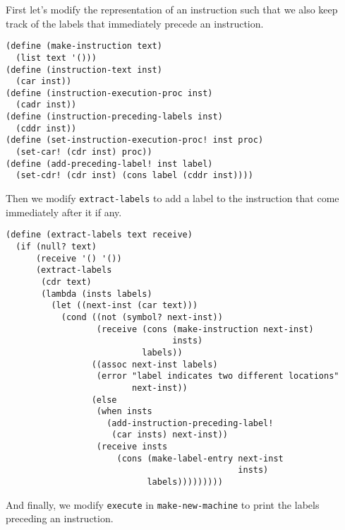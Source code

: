 \documentclass[a4paper,12pt]{article}
\begin{document}
First let's modify the representation of an instruction such that we
also keep track of the labels that immediately precede an instruction.

\begin{lstlisting}
(define (make-instruction text)
  (list text '()))
(define (instruction-text inst)
  (car inst))
(define (instruction-execution-proc inst)
  (cadr inst))
(define (instruction-preceding-labels inst)
  (cddr inst))
(define (set-instruction-execution-proc! inst proc)
  (set-car! (cdr inst) proc))
(define (add-preceding-label! inst label)
  (set-cdr! (cdr inst) (cons label (cddr inst))))
\end{lstlisting}

Then we modify \lstinline!extract-labels! to add a label to the
instruction that come immediately after it if any.

\begin{lstlisting}
(define (extract-labels text receive)
  (if (null? text)
      (receive '() '())
      (extract-labels
       (cdr text)
       (lambda (insts labels)
         (let ((next-inst (car text)))
           (cond ((not (symbol? next-inst))
                  (receive (cons (make-instruction next-inst)
                                 insts)
                           labels))
                 ((assoc next-inst labels)
                  (error "label indicates two different locations"
                         next-inst))
                 (else
                  (when insts
                    (add-instruction-preceding-label!
                     (car insts) next-inst))
                  (receive insts
                      (cons (make-label-entry next-inst
                                              insts)
                            labels)))))))))
\end{lstlisting}

And finally, we modify \lstinline!execute! in
\lstinline!make-new-machine! to print the labels preceding an
instruction.
\end{document}
